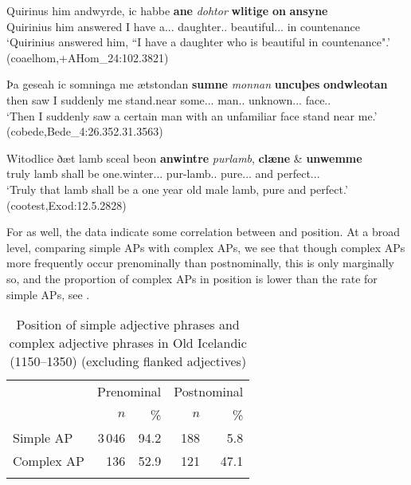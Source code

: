 \documentclass[output=paper,colorlinks,citecolor=brown,draft]{langscibook}
\begin{document}
\ea\label{OEpostCompane}
\gll Quirinus him andwyrde, ic habbe \textbf{ane} \textit{dohtor} \textbf{wlitige} \textbf{on} \textbf{ansyne}\\
	Quirinius him answered I have a.\ACC.\SG.\STR{} daughter.\ACC.\SG{} beautiful.\ACC.\SG.\STR{} in 	countenance\\
\glt ‘Quirinius answered him, “I have a daughter who is beautiful in countenance".’ (coaelhom,+AHom\_24:102.3821)
\z

\ea\label{OEpostCompsumne}
\gll Þa geseah ic somninga me ætstondan \textbf{sumne} \textit{monnan} \textbf{uncuþes} \textbf{ondwleotan}\\
then saw I suddenly me stand.near some.\ACC.\SG.\STR{} man.\ACC.\SG{} unknown.\GEN.\SG.\STR{} face.\GEN.\SG{}\\
\glt ‘Then I suddenly saw a certain man with an unfamiliar face stand near me.’ (cobede,Bede\_4:26.352.31.3563)
\z

\ea\label{OEpostCompanwintre}
\gll Witodlice ðæt lamb sceal beon \textbf{anwintre} \textit{purlamb}, \textbf{clæne} \& \textbf{unwemme}\\
truly \DEF{} lamb shall be {one.winter.\NOM.\SG.\STR{}} pur-lamb.\NOM.\SG{} pure.\NOM.\SG.\STR{} and perfect.\NOM.\SG.\STR{}\\
\glt ‘Truly that lamb shall be a one year old male lamb, pure and perfect.’ (cootest,Exod:12.5.2828)
\z

For  as well, the  data indicate some correlation between  and position. At a broad level, comparing simple APs with complex APs, we see that though complex APs more frequently occur prenominally than postnominally, this is only marginally so, and the proportion of complex APs in  position is lower than the rate for simple APs, see . 

\begin{table}
\caption{Position of simple adjective phrases and complex adjective phrases in Old Icelandic (1150–1350) (excluding flanked adjectives)}
\label{tabOIweight}

 \begin{tabular}{l rrrr}
  \lsptoprule
  & \multicolumn{2}{c}{Prenominal} & \multicolumn{2}{c}{Postnominal}\\\cmidrule(lr){2-3}\cmidrule(lr){4-5}
  & $n$ & \% & $n$ & \%\\
  \midrule
 Simple AP & 3\,046 & 94.2 & 188 & 5.8\\
 Complex AP & 136 & 52.9 & 121 & 47.1\\
 \lspbottomrule
 \end{tabular}
\end{table}
\end{document}
